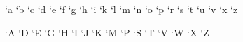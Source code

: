 \XeTeXcharclass `a \chara
\XeTeXcharclass `b \charb
\XeTeXcharclass `c \charc
\XeTeXcharclass `d \chard
\XeTeXcharclass `e \chare
\XeTeXcharclass `f \charf
\XeTeXcharclass `g \charg
\XeTeXcharclass `h \charh
\XeTeXcharclass `i \chari
\XeTeXcharclass `k \chark
\XeTeXcharclass `l \charl
\XeTeXcharclass `m \charm
\XeTeXcharclass `n \charn
\XeTeXcharclass `o \charo
\XeTeXcharclass `p \charp
\XeTeXcharclass `r \charr
\XeTeXcharclass `s \chars
\XeTeXcharclass `t \chart
\XeTeXcharclass `u \charu
\XeTeXcharclass `v \charv
\XeTeXcharclass `x \charx
\XeTeXcharclass `z \charz

\XeTeXcharclass `A \charA
\XeTeXcharclass `D \charD
\XeTeXcharclass `E \charE
\XeTeXcharclass `G \charG
\XeTeXcharclass `H \charH
\XeTeXcharclass `I \charI
\XeTeXcharclass `J \charJ
\XeTeXcharclass `K \charK
\XeTeXcharclass `M \charM
\XeTeXcharclass `P \charP
\XeTeXcharclass `S \charS
\XeTeXcharclass `T \charT
\XeTeXcharclass `V \charV
\XeTeXcharclass `W \charW
\XeTeXcharclass `X \charX
\XeTeXcharclass `Z \charZ

\XeTeXinterchartoks \charNummerEins \charHalbgeviert {\kern 0.3ex}%
\XeTeXinterchartoks \charHalbgeviert \charNummerEins {\kern 0.25ex}
\XeTeXinterchartoks \charNummerZwei \charHalbgeviert {\kern 0.2ex}%
\XeTeXinterchartoks \charHalbgeviert \charNummerZwei {\kern 0.25ex}
\XeTeXinterchartoks \charNummerDrei \charHalbgeviert {\kern 0.2ex}%
\XeTeXinterchartoks \charHalbgeviert \charNummerDrei {\kern 0.25ex}
\XeTeXinterchartoks \charNummerVier \charHalbgeviert {\kern 0.25ex}%
\XeTeXinterchartoks \charHalbgeviert \charNummerVier {\kern 0.2ex}%
\XeTeXinterchartoks {} \charHalbgeviert {\kern 0.2ex}%
\XeTeXinterchartoks \charHalbgeviert {}
\XeTeXinterchartoks \charNummerSechs \charHalbgeviert {\kern 0.21ex}%
\XeTeXinterchartoks \charHalbgeviert \charNummerSieben {\kern 0.3ex}
\XeTeXinterchartoks \charNummerSieben \charHalbgeviert {\kern 0.3ex}%
\XeTeXinterchartoks \charHalbgeviert \charNummerSechs {\kern 0.35ex}
\XeTeXinterchartoks \charNummerAcht \charHalbgeviert {\kern 0.25ex}%
\XeTeXinterchartoks \charHalbgeviert \charNummerAcht {\kern 0.25ex}
\XeTeXinterchartoks \charNummerNeun \charHalbgeviert {\kern 0.2ex}%
\XeTeXinterchartoks \charHalbgeviert \charNummerNeun {\kern 0.2ex}
\XeTeXinterchartoks \charNummerNull \charHalbgeviert {\kern 0.3ex}%
\XeTeXinterchartoks \charHalbgeviert \charNummerNull {\kern 0.35ex}

\XeTeXinterchartoks \charHalbgeviert \charE {\kern 0.25ex}

